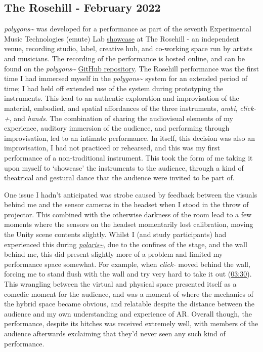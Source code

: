 \subsection{The Rosehill - February 2022} \label{sec: polygons-performances-rosehill}
\textit{polygons\textasciitilde{}} was developed for a performance as part of the seventh Experimental Music Technologies (emute) Lab \href{http://www.emutelab.org/blog/emutelab6}{showcase} at The Rosehill - an independent venue, recording studio, label, creative hub, and co-working space run by artists and musicians. The recording of the performance is hosted online, and can be found on the \textit{polygons\textasciitilde{}} \href{https://github.com/sambilbow/polygons}{GitHub repository}. The Rosehill performance was the first time I had immersed myself in the \textit{polygons\textasciitilde{}} system for an extended period of time; I had held off extended use of the system during prototyping the instruments. This lead to an authentic exploration and improvisation of the material, embodied, and spatial affordances of the three instruments, \textit{ambi}, \textit{click-+}, and \textit{hands}. The combination of sharing the audiovisual elements of my experience, auditory immersion of the audience, and performing through improvisation, led to an intimate performance. In itself, this decision was also an improvisation, I had not practiced or rehearsed, and this was my first performance of a non-traditional instrument. This took the form of me taking it upon myself to `showcase' the instruments to the audience, through a kind of theatrical and gestural dance that the audience were invited to be part of. 

One issue I hadn't anticipated was strobe caused by feedback between the visuals behind me and the sensor cameras in the headset when I stood in the throw of projector. This combined with the otherwise darkness of the room lead to a few moments where the sensors on the headset momentarily lost calibration, moving the Unity scene contents slightly. Whilst I (and study participants) had experienced this during \hyperref[sec: polaris-feedback-adoption-alignment]{\textit{polaris\textasciitilde{}}}, due to the confines of the stage, and the wall behind me, this did present slightly more of a problem and limited my performance space somewhat. For example, when \textit{click-} moved behind the wall, forcing me to stand flush with the wall and try very hard to take it out (\href{https://youtu.be/9IErsDvhXjM?t=210}{03:30}). This wrangling between the virtual and physical space presented itself as a comedic moment for the audience, and was a moment of where the mechanics of the hybrid space became obvious, and relatable despite the distance between the audience and my own understanding and experience of AR. Overall though, the performance, despite its hitches was received extremely well, with members of the audience afterwards exclaiming that they'd never seen any such kind of performance. 

